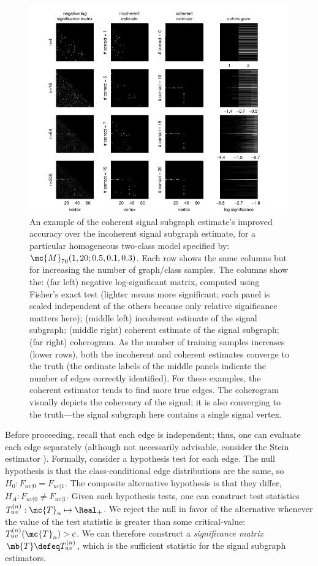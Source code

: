\documentclass[10pt,journal,cspaper,compsoc]{IEEEtran}
\begin{document}
\begin{figure}[tb!]
	\centering
		\includegraphics[width=1.0\linewidth]{../figs/demo_4x4_homo_V70_s20_p10_q30.pdf}
	\caption{An example of the coherent signal subgraph estimate's improved accuracy over the incoherent signal subgraph estimate, for a particular homogeneous two-class model specified by: $\mc{M}_{70}(1,20;0.5,0.1,0.3)$. Each row shows the same columns but for increasing the number of graph/class samples.  The columns show the: (far left) negative log-significant matrix, computed using Fisher's exact test (lighter means more significant; each panel is scaled independent of the others because only relative significance matters here); (middle left) incoherent estimate of the signal subgraph; (middle right) coherent estimate of the signal subgraph; (far right) coherogram.  As the number of training samples increases (lower rows), both the incoherent and coherent estimates converge to the truth (the ordinate labels of the middle panels indicate the number of edges correctly identified).  For these examples, the coherent estimator tends to find more true edges.  The coherogram visually depicts the coherency of the signal; it is also converging to the truth---the signal subgraph here contains a single signal vertex.}
	\label{fig:4x4}
\end{figure}



Before proceeding, recall that each edge is independent; thus, one can evaluate each edge separately (although not necessarily advisable, consider the Stein estimator \cite{Stein1956}).  Formally, consider a hypothesis test for each edge.  The null hypothesis is that the class-conditional edge distributions are the same, so $H_0: F_{uv|0}=F_{uv|1}$.  The composite alternative hypothesis is that they differ, $H_A: F_{uv|0} \neq F_{uv|1}$.  Given such hypothesis tests, one can construct test statistics $T_{uv}^{(n)}: \mc{T}_n \mapsto \Real_+$.  We reject the null in favor of the alternative whenever the value of the test statistic is greater than some critical-value: $T_{uv}^{(n)}(\mc{T}_n)>c$.  We can therefore construct a \emph{significance matrix} $\mb{T} \defeq T_{uv}^{(n)}$, which is the sufficient statistic for the signal subgraph estimators. %
\end{document}
